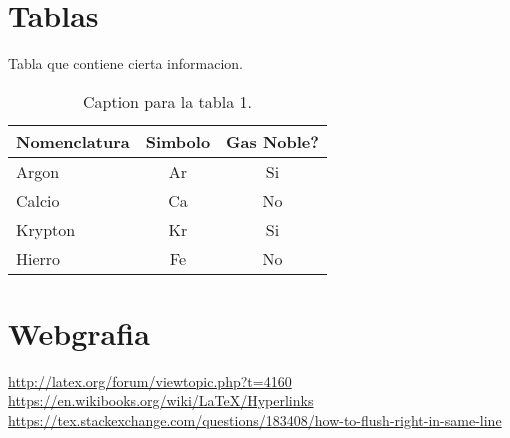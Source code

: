 \documentclass[12pt]{article}
\begin{document}
\section{Tablas}\label{sec:table}
Tabla que contiene cierta informacion.
\begin{table}[H]
	\centering
	\label{tab:tab1}
	\caption{Caption para la tabla 1.}
	\begin{tabular}{l c c}
		\bfseries{Nomenclatura} & \bfseries{Simbolo} & \bfseries{Gas Noble?} \\ \hline
		Argon & Ar & Si \\
		Calcio & Ca & No \\
		Krypton & Kr & Si \\
		Hierro & Fe & No \\
	\end{tabular}
\end{table}
\newpage
\section{Webgrafia}\label{sec:web}
\url{http://latex.org/forum/viewtopic.php?t=4160} \\
\url{https://en.wikibooks.org/wiki/LaTeX/Hyperlinks} \\
\url{https://tex.stackexchange.com/questions/183408/how-to-flush-right-in-same-line} \\
\end{document}
